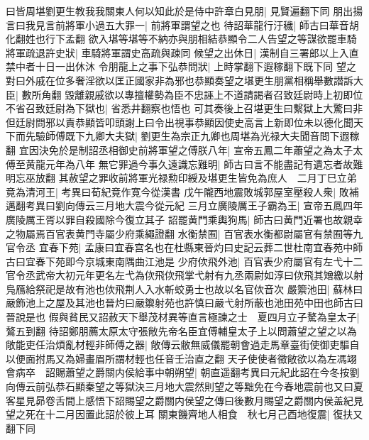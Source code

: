 曰皆周堪劉更生教我我關東人何以知此於是侍中許章白見朋|{
	見賢遍翻下同}
朋出揚言曰我見言前將軍小過五大罪一|{
	前將軍謂望之也}
待詔華龍行汙穢|{
	師古曰華音胡化翻姓也行下孟翻}
欲入堪等堪等不納亦與朋相結恭顯令二人告望之等謀欲罷車騎將軍疏退許史狀|{
	車騎將軍謂史高疏與疎同}
候望之出休日|{
	漢制自三署郎以上入直禁中者十日一出休沐}
令朋龍上之事下弘恭問狀|{
	上時掌翻下遐稼翻下既下同}
望之對曰外戚在位多奢淫欲以匡正國家非為邪也恭顯奏望之堪更生朋黨相稱舉數譛訴大臣|{
	數所角翻}
毀離親戚欲以專擅權勢為臣不忠誣上不道請謁者召致廷尉時上初即位不省召致廷尉為下獄也|{
	省悉井翻察也悟也}
可其奏後上召堪更生曰繫獄上大驚曰非但廷尉問邪以責恭顯皆叩頭謝上曰令出視事恭顯因使史高言上新即位未以德化聞天下而先驗師傅既下九卿大夫獄|{
	劉更生為宗正九卿也周堪為光禄大夫聞音問下遐稼翻}
宜因決免於是制詔丞相御史前將軍望之傅朕八年|{
	宣帝五鳳二年蕭望之為太子太傅至黄龍元年為八年}
無它罪過今事久遠識忘難明|{
	師古曰言不能盡記有遺忘者故難明忘巫放翻}
其赦望之罪收前將軍光禄勲印綬及堪更生皆免為庶人　二月丁巳立弟竟為清河王|{
	考異曰荀紀竟作寛今從漢書}
戊午隴西地震敗城郭屋室壓殺人衆|{
	敗補邁翻考異曰劉向傳云三月地大震今從元紀}
三月立廣陵厲王子霸為王|{
	宣帝五鳳四年廣陵厲王胥以罪自殺國除今復立其子}
詔罷黄門乘輿狗馬|{
	師古曰黄門近署也故親幸之物屬焉百官表黄門寺屬少府乘繩證翻}
水衡禁囿|{
	百官表水衡都尉屬官有禁囿等九官令丞}
宜春下苑|{
	孟康曰宜春宫名也在杜縣東晉灼曰史記云葬二世杜南宜春苑中師古曰宜春下苑即今京城東南隅曲江池是}
少府佽飛外池|{
	百官表少府屬官有左弋十二官令丞武帝大初元年更名左弋為佽飛佽飛掌弋射有九丞兩尉如淳曰佽飛其矰繳以射鳬鴈給祭祀是故有池也佽飛荆人入水斬蛟勇士也故以名官佽音次}
嚴籞池田|{
	蘇林曰嚴飾池上之屋及其池也晉灼曰嚴籞射苑也許慎曰嚴弋射所蔽也池田苑中田也師古曰晉說是也}
假與貧民又詔赦天下舉茂材異等直言極諫之士　夏四月立子驁為皇太子|{
	鷔五到翻}
待詔鄭朋薦太原太守張敞先帝名臣宜傅輔皇太子上以問蕭望之望之以為敞能吏任治煩亂材輕非師傅之器|{
	敞傳云敝無威儀罷朝會過走馬章臺街使御吏驅自以便面拊馬又為婦畫眉所謂材輕也任音壬治直之翻}
天子使使者徵敞欲以為左馮翊會病卒　詔賜蕭望之爵關内侯給事中朝朔望|{
	朝直遥翻考異曰元紀此詔在今冬按劉向傳云前弘恭石顯秦望之等獄決三月地大震然則望之等黜免在今春地震前也又曰夏客星見昴卷舌間上感悟下詔賜望之爵關内侯望之傳曰後數月賜望之爵關内侯盖紀見望之死在十二月因置此詔於彼上耳}
關東饑齊地人相食　秋七月己酉地復震|{
	復扶又翻下同}


